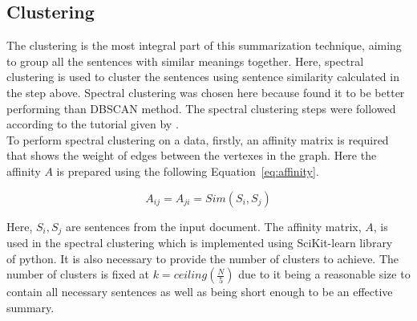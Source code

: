 %

\subsection{Clustering}\label{subsec:clustering}
The clustering is the most integral part of this summarization technique, aiming to group all the
sentences with similar meanings together.
Here, spectral clustering is used to cluster the sentences using sentence similarity calculated in the step above.
Spectral clustering was chosen here because \citeauthor{roychowdhury-etal-2022-spectral-base}
\cite{roychowdhury-etal-2022-spectral-base} found it to be better performing than DBSCAN method.
The spectral clustering steps were followed according to the tutorial given by
\cite{vonLuxburg-2007-spectral-tutorial}. \\

To perform spectral clustering on a data, firstly, an affinity matrix is required that shows
the weight of edges between the vertexes in the graph.
Here the affinity $A$ is prepared using the following Equation~\ref{eq:affinity}.

\begin{equation}\label{eq:affinity}
    A_{ij}=A_{ji}=Sim(S_i,S_j)
\end{equation}

Here, $S_i, S_j$ are sentences from the input document.
The affinity matrix, $A$, is used in the spectral clustering which is implemented using
SciKit-learn library~\cite{Pedregosa-2011-scikit-learn} of python.
It is also necessary to provide the number of clusters to achieve.
The number of clusters is fixed at $k=ceiling\left(\frac{N}{5}\right)$ due to it being a
reasonable size to contain all necessary sentences as well as being short enough to be an effective summary.

